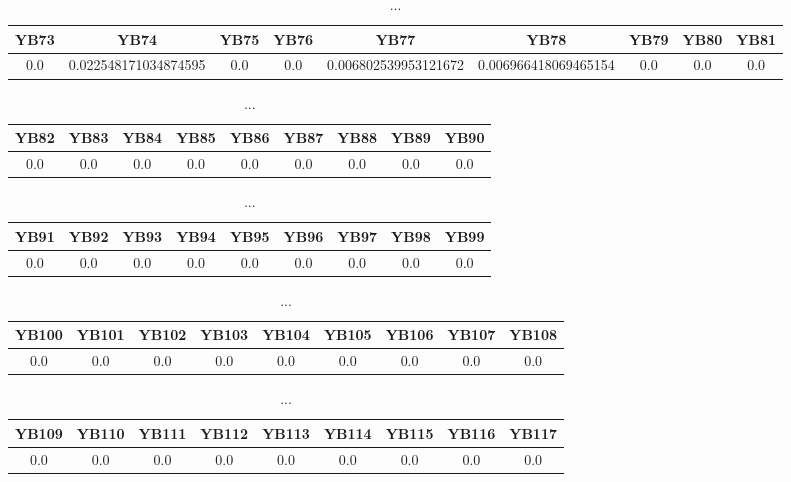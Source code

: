 \documentclass[]{article}
\begin{document}
\begin{table}[h]
      \centering
      \begin{tabular}{|c|c|c|c|c|c|c|c|c|}
            \hline
            YB73 & YB74                 & YB75 & YB76 & YB77                 & YB78                 & YB79 & YB80 & YB81 \\
            \hline
            0.0  & 0.022548171034874595 & 0.0  & 0.0  & 0.006802539953121672 & 0.006966418069465154 & 0.0  & 0.0  & 0.0  \\
            \hline
      \end{tabular}
      \caption{...}
\end{table}
\begin{table}[h]
      \centering
      \begin{tabular}{|c|c|c|c|c|c|c|c|c|}
            \hline
            YB82 & YB83 & YB84 & YB85 & YB86 & YB87 & YB88 & YB89 & YB90 \\
            \hline
            0.0  & 0.0  & 0.0  & 0.0  & 0.0  & 0.0  & 0.0  & 0.0  & 0.0  \\
            \hline
      \end{tabular}
      \caption{...}
\end{table}
\begin{table}[h]
      \centering
      \begin{tabular}{|c|c|c|c|c|c|c|c|c|}
            \hline
            YB91 & YB92 & YB93 & YB94 & YB95 & YB96 & YB97 & YB98 & YB99 \\
            \hline
            0.0  & 0.0  & 0.0  & 0.0  & 0.0  & 0.0  & 0.0  & 0.0  & 0.0  \\
            \hline
      \end{tabular}
      \caption{...}
\end{table}
\begin{table}[h]
      \centering
      \begin{tabular}{|c|c|c|c|c|c|c|c|c|}
            \hline
            YB100 & YB101 & YB102 & YB103 & YB104 & YB105 & YB106 & YB107 & YB108 \\
            \hline
            0.0   & 0.0   & 0.0   & 0.0   & 0.0   & 0.0   & 0.0   & 0.0   & 0.0   \\
            \hline
      \end{tabular}
      \caption{...}
\end{table}
\begin{table}[h]
      \centering
      \begin{tabular}{|c|c|c|c|c|c|c|c|c|}
            \hline
            YB109 & YB110 & YB111 & YB112 & YB113 & YB114 & YB115 & YB116 & YB117 \\
            \hline
            0.0   & 0.0   & 0.0   & 0.0   & 0.0   & 0.0   & 0.0   & 0.0   & 0.0   \\
            \hline
      \end{tabular}
      \caption{...}
\end{table}
\end{document}
